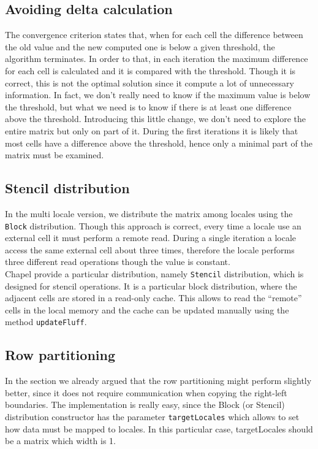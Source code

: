 \documentclass{article}
\begin{document}
\subsection{Avoiding delta calculation}
The convergence criterion states that, when for each cell the difference between the old value and the new computed one is below a given threshold, the algorithm terminates. In order to that, in each iteration the maximum difference for each cell is calculated and it is compared with the threshold. Though it is correct, this is not the optimal solution since it compute a lot of unnecessary information. In fact, we don't really need to know if the maximum value is below the threshold, but what we need is to know if there is at least one difference above the threshold. Introducing this little change, we don't need to explore the entire matrix but only on part of it. During the first iterations it is likely that most cells have a difference above the threshold, hence only a minimal part of the matrix must be examined.

\subsection{Stencil distribution}
In the multi locale version, we distribute the matrix among locales using the \texttt{Block} distribution. Though this approach is correct, every time a locale use an external cell it must perform a remote read. During a single iteration a locale access the same external cell about three times, therefore the locale performs three different read operations though the value is constant. \\
Chapel provide a particular distribution, namely \texttt{Stencil} distribution, which is designed for stencil operations. It is a particular block distribution, where the adjacent cells are stored in a read-only cache. This allows to read the “remote” cells in the local memory and the cache can be updated manually using the method \texttt{updateFluff}.

\subsection{Row partitioning}
In the section  we already argued that the row partitioning might perform slightly better, since it does not require communication when copying the right-left boundaries. The implementation is really easy, since the Block (or Stencil) distribution constructor has the parameter \texttt{targetLocales} which allows to set how data must be mapped to locales. In this particular case, targetLocales should be a matrix which width is 1.
\end{document}
